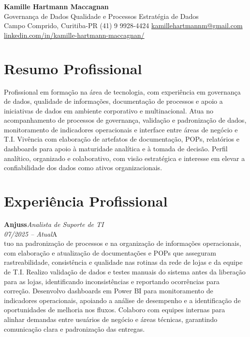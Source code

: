 \documentclass[11pt,a4paper]{article}
\newcommand{\cvrole}[4]{%
  \vspace{4pt}%
  {\bfseries\color{accentcolor}#1}\hfill{\itshape #2}\\[-2pt]%
  {\itshape #3}\hfill #4\\[6pt]%
}
\begin{document}
\begin{center}
  {\fontsize{20}{24}\selectfont\bfseries Kamille Hartmann Maccagnan}\\[8pt]
  {\large Governança de Dados \textbar{} Qualidade e Processos \textbar{} Estratégia de Dados}\\[10pt]
  Campo Comprido, Curitiba-PR \enspace\textbullet\enspace (41) 9 9928-4424 \enspace\textbullet\enspace
  \href{mailto:kamillehartmannm@gmail.com}{kamillehartmannm@gmail.com}\\[3pt]
  \href{https://linkedin.com/in/kamille-hartmann-maccagnan/}{linkedin.com/in/kamille-hartmann-maccagnan/}
\end{center}

\vspace{6pt}

\section{Resumo Profissional}

Profissional em formação na área de tecnologia, com experiência em governança de dados, qualidade de informações, documentação de processos e apoio a iniciativas de dados em ambiente corporativo e multinacional. Atua no acompanhamento de processos de governança, validação e padronização de dados, monitoramento de indicadores operacionais e interface entre áreas de negócio e T.I. Vivência com elaboração de artefatos de documentação, POPs, relatórios e dashboards para apoio à maturidade analítica e à tomada de decisão. Perfil analítico, organizado e colaborativo, com visão estratégica e interesse em elevar a confiabilidade dos dados como ativos organizacionais.

\section{Experiência Profissional}

\cvrole{Anjuss}{Analista de Suporte de TI}{07/2025 -- Atual}

Atuo na padronização de processos e na organização de informações operacionais, com elaboração e atualização de documentações e POPs que asseguram rastreabilidade, consistência e qualidade nas rotinas da rede de lojas e da equipe de T.I. Realizo validação de dados e testes manuais do sistema antes da liberação para as lojas, identificando inconsistências e reportando ocorrências para correção. Desenvolvo dashboards em Power BI para monitoramento de indicadores operacionais, apoiando a análise de desempenho e a identificação de oportunidades de melhoria nos fluxos. Colaboro com equipes internas para alinhar demandas entre usuários de negócio e áreas técnicas, garantindo comunicação clara e padronização das entregas.
\end{document}
